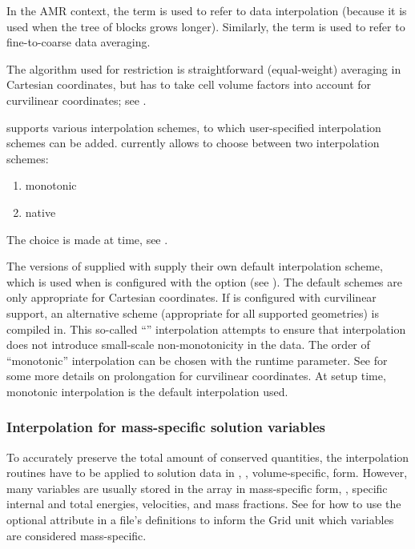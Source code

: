 In the AMR context, the term %
is used to refer to data interpolation
(because it is used when the tree of blocks grows longer).
Similarly, the term %
is used to refer to fine-to-coarse data averaging.

The algorithm used for restriction is straightforward (equal-weight)
averaging in Cartesian coordinates, but has to
take cell volume factors into account for curvilinear coordinates;
see .


\Paramesh supports various interpolation%
schemes, to which user-specified interpolation schemes can be added.
\flashx currently allows to choose between two interpolation schemes:
\begin{enumerate}
\item monotonic
\item native
\end{enumerate}
The choice is made at  time, see .



The versions of \Paramesh supplied with \flashx supply their own
default interpolation scheme, which is used when \flashx is
configured with the  
option (see ). The default schemes are only
appropriate for Cartesian coordinates. If \flashx is configured
with curvilinear support, an alternative scheme (appropriate for all
supported geometries) is compiled in. This so-called
``'' interpolation attempts to ensure that
interpolation does not introduce small-scale non-monotonicity in the
data. The order of ``monotonic'' interpolation can be chosen with the
runtime
parameter. See  for some more details
on prolongation for curvilinear coordinates.  At setup time, monotonic
interpolation is the default interpolation used.

\subsubsection{Interpolation for mass-specific solution variables}
\label{Sec:InterpMassSpecific}
To accurately preserve the total amount of conserved quantities,
the interpolation routines have to be applied to solution data in
, \ie, volume-specific, form. However, many variables
are usually stored in the  array in mass-specific form,
\eg, specific internal and total energies, velocities, and mass
fractions. See  for how to use
the optional  attribute in a  file's
 definitions to inform the \unit{Grid} unit
which variables are considered mass-specific.

